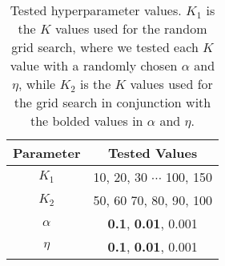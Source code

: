 \begin{table}[h]
	\centering
	\caption{Tested hyperparameter values. $K_1$ is the $K$ values used for the random grid search, where we tested each $K$ value with a randomly chosen $\alpha$ and $\eta$, while $K_2$ is the $K$ values used for the grid search in conjunction with the bolded values in $\alpha$ and $\eta$.}
	\begin{tabular}{c|c}
		Parameter & Tested Values\\
		\midrule
		$K_1$ & 10, 20, 30 $\cdots$ 100, 150\\
		$K_2$ & 50, 60 70, 80, 90, 100\\
		$\alpha$ & \textbf{0.1}, \textbf{0.01}, 0.001\\
		$\eta$ & \textbf{0.1}, \textbf{0.01}, 0.001\\
	\end{tabular}
	\label{tab:gridsearch}
\end{table}
